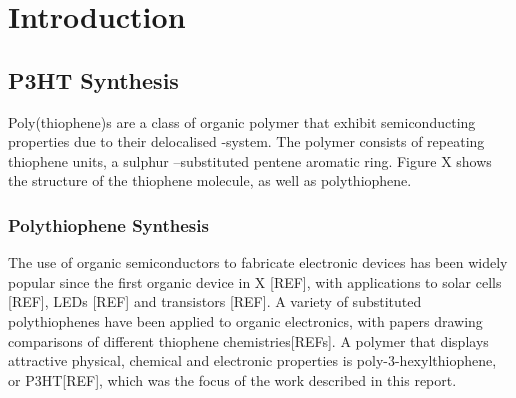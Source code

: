 \chapter{Introduction}

\section{P3HT Synthesis}
Poly(thiophene)s are a class of organic polymer that exhibit semiconducting properties due to their delocalised -system. The polymer consists of repeating thiophene units, a sulphur –substituted pentene aromatic ring. Figure X shows the structure of the thiophene molecule, as well as polythiophene. 

\subsection{Polythiophene Synthesis}

The use of organic semiconductors to fabricate electronic devices has been widely popular since the first organic device in X [REF], with applications to solar cells [REF], LEDs [REF] and transistors [REF]. A variety of substituted polythiophenes have been applied to organic electronics, with papers drawing comparisons of different thiophene chemistries[REFs]. A polymer that displays attractive physical, chemical and electronic properties is poly-3-hexylthiophene, or P3HT[REF], which was the focus of the work described in this report. 

